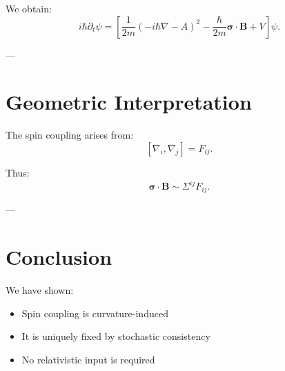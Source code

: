 \documentclass[11pt]{article}
\begin{document}
We obtain:
\[
i\hbar \partial_t \psi =
\left[
\frac{1}{2m}(-i\hbar\nabla - A)^2
- \frac{\hbar}{2m}\bm{\sigma}\cdot \bm{B}
+ V
\right]\psi.
\]

---

\section{Geometric Interpretation}

The spin coupling arises from:
\[
[\nabla_i,\nabla_j] = F_{ij}.
\]

Thus:
\[
\bm{\sigma}\cdot \bm{B}
\sim \Sigma^{ij}F_{ij}.
\]

---

\section{Conclusion}

We have shown:

\begin{itemize}
\item Spin coupling is curvature-induced
\item It is uniquely fixed by stochastic consistency
\item No relativistic input is required
\end{itemize}
\end{document}
